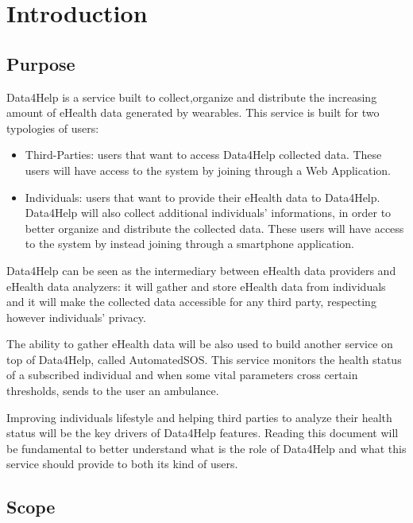 
\chapter{Introduction}
\section{Purpose}
Data4Help is a service built to collect,organize and distribute the increasing amount of eHealth data generated by wearables.
\givespace
This service is built for two typologies of users:
\begin{itemize}
\item Third-Parties: users that want to access Data4Help collected data. These users will have access to the system by joining through a Web Application.
\item Individuals: users that want to provide their eHealth data to Data4Help. Data4Help will also collect additional individuals' informations, in order to better organize and distribute the collected data.
These users will have access to the system by instead joining through a smartphone application.
\end{itemize}
Data4Help can be seen as the intermediary between eHealth data providers and eHealth data analyzers: it will gather  and store eHealth data from individuals and it will make the collected data accessible for any third party, respecting however individuals' privacy.
\givespace

The ability to gather eHealth data will be also used to build another service on top of Data4Help, called AutomatedSOS.
This service monitors the health status of a subscribed individual and when some vital parameters cross certain thresholds, sends to the user an ambulance.
\givespace

Improving individuals lifestyle and helping third parties to analyze their health status will be the key drivers of Data4Help features.
\givespace
Reading this document will be fundamental to better understand what is the role of Data4Help and what this service should provide to both its kind of users.





\section{Scope}
